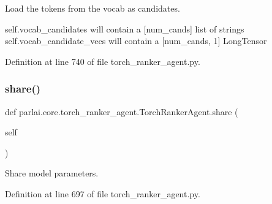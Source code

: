 \begin{DoxyVerb}Load the tokens from the vocab as candidates.

self.vocab_candidates will contain a [num_cands] list of strings
self.vocab_candidate_vecs will contain a [num_cands, 1] LongTensor
\end{DoxyVerb}
 

Definition at line 740 of file torch\+\_\+ranker\+\_\+agent.\+py.

\mbox{\label{classparlai_1_1core_1_1torch__ranker__agent_1_1TorchRankerAgent_a9ba5899b6497645bb6d406ecc2441da7}} 
\subsubsection{\texorpdfstring{share()}{share()}}
{\footnotesize\ttfamily def parlai.\+core.\+torch\+\_\+ranker\+\_\+agent.\+Torch\+Ranker\+Agent.\+share (\begin{DoxyParamCaption}\item[{}]{self }\end{DoxyParamCaption})}

\begin{DoxyVerb}Share model parameters.\end{DoxyVerb}
 

Definition at line 697 of file torch\+\_\+ranker\+\_\+agent.\+py.



